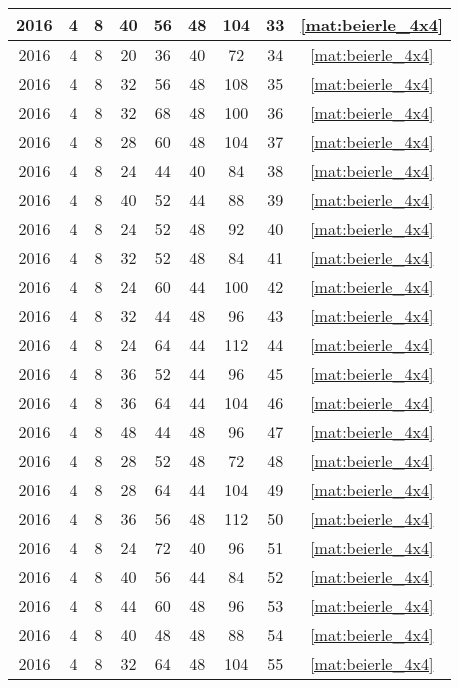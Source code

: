 \begin{longtable}{|c|c|c|c|c|c|c|c|c|}
2016 & 4 & 8 & 40 & 56 & 48 & 104 & 33 & \eqref{mat:beierle_4x4} \\ \hline 
2016 & 4 & 8 & 20 & 36 & 40 & 72 & 34 & \eqref{mat:beierle_4x4} \\ \hline 
2016 & 4 & 8 & 32 & 56 & 48 & 108 & 35 & \eqref{mat:beierle_4x4} \\ \hline 
2016 & 4 & 8 & 32 & 68 & 48 & 100 & 36 & \eqref{mat:beierle_4x4} \\ \hline 
2016 & 4 & 8 & 28 & 60 & 48 & 104 & 37 & \eqref{mat:beierle_4x4} \\ \hline 
2016 & 4 & 8 & 24 & 44 & 40 & 84 & 38 & \eqref{mat:beierle_4x4} \\ \hline 
2016 & 4 & 8 & 40 & 52 & 44 & 88 & 39 & \eqref{mat:beierle_4x4} \\ \hline 
2016 & 4 & 8 & 24 & 52 & 48 & 92 & 40 & \eqref{mat:beierle_4x4} \\ \hline 
2016 & 4 & 8 & 32 & 52 & 48 & 84 & 41 & \eqref{mat:beierle_4x4} \\ \hline 
2016 & 4 & 8 & 24 & 60 & 44 & 100 & 42 & \eqref{mat:beierle_4x4} \\ \hline 
2016 & 4 & 8 & 32 & 44 & 48 & 96 & 43 & \eqref{mat:beierle_4x4} \\ \hline 
2016 & 4 & 8 & 24 & 64 & 44 & 112 & 44 & \eqref{mat:beierle_4x4} \\ \hline 
2016 & 4 & 8 & 36 & 52 & 44 & 96 & 45 & \eqref{mat:beierle_4x4} \\ \hline 
2016 & 4 & 8 & 36 & 64 & 44 & 104 & 46 & \eqref{mat:beierle_4x4} \\ \hline 
2016 & 4 & 8 & 48 & 44 & 48 & 96 & 47 & \eqref{mat:beierle_4x4} \\ \hline 
2016 & 4 & 8 & 28 & 52 & 48 & 72 & 48 & \eqref{mat:beierle_4x4} \\ \hline 
2016 & 4 & 8 & 28 & 64 & 44 & 104 & 49 & \eqref{mat:beierle_4x4} \\ \hline 
2016 & 4 & 8 & 36 & 56 & 48 & 112 & 50 & \eqref{mat:beierle_4x4} \\ \hline 
2016 & 4 & 8 & 24 & 72 & 40 & 96 & 51 & \eqref{mat:beierle_4x4} \\ \hline 
2016 & 4 & 8 & 40 & 56 & 44 & 84 & 52 & \eqref{mat:beierle_4x4} \\ \hline 
2016 & 4 & 8 & 44 & 60 & 48 & 96 & 53 & \eqref{mat:beierle_4x4} \\ \hline 
2016 & 4 & 8 & 40 & 48 & 48 & 88 & 54 & \eqref{mat:beierle_4x4} \\ \hline 
2016 & 4 & 8 & 32 & 64 & 48 & 104 & 55 & \eqref{mat:beierle_4x4} \\ \hline 

\end{longtable}
